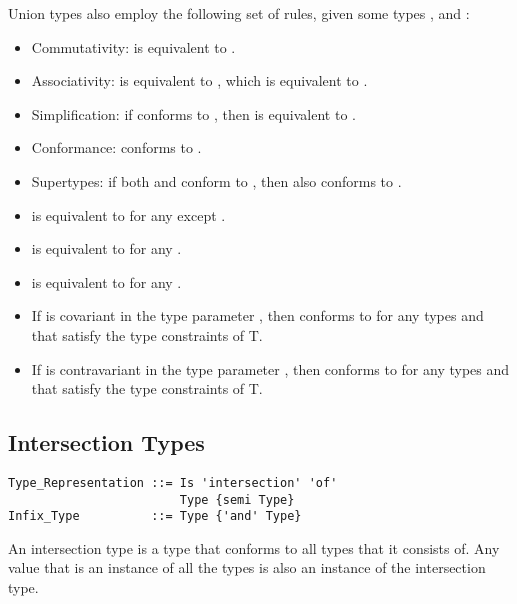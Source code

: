 Union types also employ the following set of rules, given some types ,  and :
\begin{itemize}
  \item Commutativity:  is equivalent to . 
  \item Associativity:  is equivalent to , which is equivalent to . 
  \item Simplification: if  conforms to , then  is equivalent to . 
  \item Conformance:  conforms to . 
  \item Supertypes: if both  and  conform to , then  also conforms to . 
  
  \item {} is equivalent to  for any  except . 
  \item {} is equivalent to  for any . 
  \item {} is equivalent to  for any . 
  
  \item If  is covariant in the type parameter , then  conforms to  for any types  and  that satisfy the type constraints of T. 
  \item If  is contravariant in the type parameter , then  conforms to  for any types  and  that satisfy the type constraints of T. 
\end{itemize}





\subsection{Intersection Types}
\label{sec:intersection-types}

\syntax\begin{lstlisting}
Type_Representation ::= Is 'intersection' 'of'
                        Type {semi Type}
Infix_Type          ::= Type {'and' Type}
\end{lstlisting}

An intersection type is a type that conforms to all types that it consists of. Any value that is an instance of all the types is also an instance of the intersection type. 

